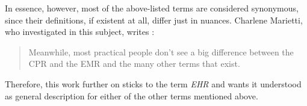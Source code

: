 In essence, however, most of the above-listed terms are considered synonymous,
since their definitions, if existent at all, differ just in nuances. Charlene
Marietti, who investigated in this subject, writes \cite{marietti}:

\begin{quote}
    Meanwhile, most practical people don't see a big difference between the CPR
    and the EMR and the many other terms that exist.
\end{quote}

Therefore, this work further on sticks to the term \emph{EHR} and wants it
understood as general description for either of the other terms mentioned
above.
